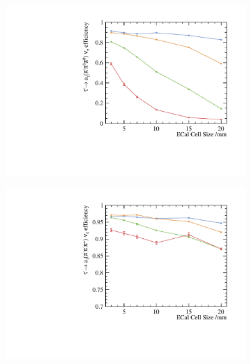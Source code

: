 \begin{figure}[htbp]
\begin{subfigure}[b]{0.45\textwidth}
  \caption{}
  \label{fig:tauDecayMode3}
\end{subfigure}
\begin{subfigure}[b]{0.45\textwidth}
  \includegraphics[width=\textwidth]{tau/plots3/decayMode4.pdf}
  \caption{}
  \label{fig:tauDecayMode4}
\end{subfigure}
\begin{subfigure}[b]{0.45\textwidth}
  \includegraphics[width=\textwidth]{tau/plots3/decayMode5.pdf}
  \caption{}
  \label{fig:tauDecayMode5}
\end{subfigure}
\begin{subfigure}[b]{0.45\textwidth}

\end{subfigure}
\end{figure}
